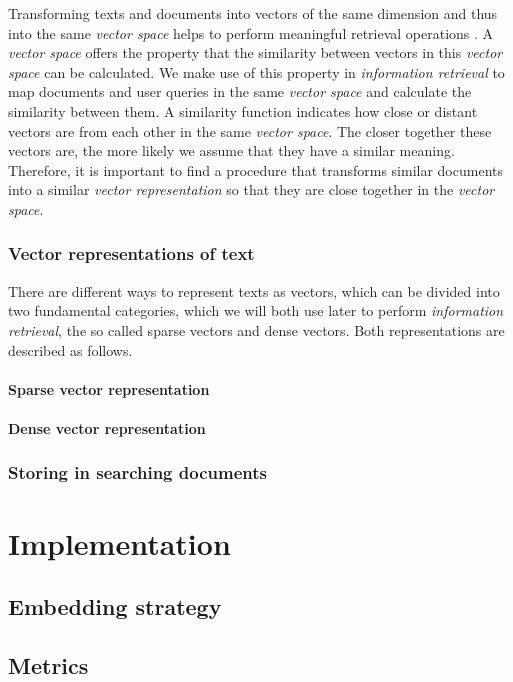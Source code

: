 \documentclass{article}
\begin{document}
Transforming texts and documents into vectors of the same dimension and thus into the same \textit{vector space} helps to perform meaningful retrieval operations \cite{vectorSpaceModel}. A \textit{vector space} offers the property that the similarity between vectors in this \textit{vector space} can be calculated. We make use of this property in \textit{information retrieval} to map documents and user queries in the same \textit{vector space} and calculate the similarity between them. A similarity function indicates how close or distant vectors are from each other in the same \textit{vector space}. The closer together these vectors are, the more likely we assume that they have a similar meaning. Therefore, it is important to find a procedure that transforms similar documents into a similar \textit{vector representation} so that they are close together in the \textit{vector space}.

\subsubsection{Vector representations of text}
There are different ways to represent texts as vectors, which can be divided into two fundamental categories, which we will both use later to perform \textit{information retrieval}, the so called sparse vectors and dense vectors. Both representations are described as follows.

\paragraph{Sparse vector representation}

\paragraph{Dense vector representation}

\subsubsection{Storing in searching documents}

\section{Implementation}
\subsection{Embedding strategy}
\subsection{Metrics}

\newpage


\end{document}
